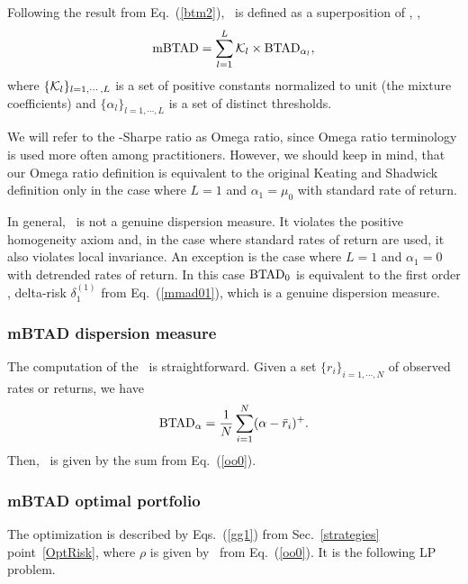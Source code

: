 Following the result from  Eq.~(\ref{btm2}), \mBTAD\ is defined as a superposition of \BTAD, \ie,
\begin{equation}
    \mBTAD = \sum_{l=1}^L \cK_l \times \BTAD_{\alpha_l},
    \label{oo0}
\end{equation}
where $\{{\cal K}_l\}_{l=1,\cdots,L}$ is a set of positive constants normalized to unit (the mixture coefficients) and
$\{\alpha_l\}_{l=1,\cdots,L}$ is a set of distinct thresholds.

We will refer to the \mBTAD-Sharpe ratio as Omega ratio, since Omega ratio terminology is used more often among practitioners. However,
we should keep in mind, that our Omega ratio definition is equivalent to the original Keating and Shadwick \cite{Keating}
definition only in the case where $L=1$ and $\alpha_1 = \mu_0$ with standard rate of return.

In general, \mBTAD\ is not a genuine dispersion measure. It violates the positive homogeneity axiom and, in the case where standard rates of return
are used, it also violates local invariance. An exception is the case where $L=1$ and $\alpha_1=0$ with detrended rates of return.
In this case ${\rm BTAD}_0$ is equivalent to the first order \mMAD, delta-risk $\delta^{(1)}_1$ from Eq.~(\ref{mmad01}), which is a
genuine dispersion measure.

\BackToContents

\subsubsection{mBTAD dispersion measure}
The computation of the \BTAD\ is straightforward. Given a set $\{r_i\}_{i=1,\cdots,N}$ of observed rates or returns, we have
\begin{equation}
    \BTAD_\alpha = \frac{1}{N}\sum_{i=1}^N (\alpha - \br_i)^+.
    \label{btad01}
\end{equation}
Then, \mBTAD\ is given by the sum from Eq.~(\ref{oo0}).

\BackToContents

\subsubsection{mBTAD optimal portfolio}
The optimization is described by Eqs.~(\ref{gg1}) from Sec.~\ref{strategies} point~\ref{OptRisk},
where $\rho$ is given by \mBTAD\ from Eq.~(\ref{oo0}).
It is the following LP problem.

